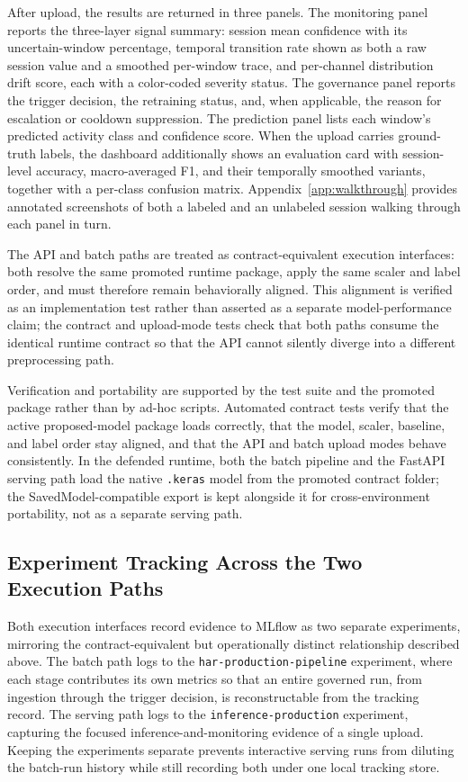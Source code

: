 After upload, the results are returned in three panels. The monitoring panel reports the
three-layer signal summary: session mean confidence with its uncertain-window percentage,
temporal transition rate shown as both a raw session value and a smoothed per-window trace,
and per-channel distribution drift score, each with a color-coded severity status. The
governance panel reports the trigger decision, the retraining status, and, when applicable,
the reason for escalation or cooldown suppression. The prediction panel lists each window's
predicted activity class and confidence score. When the upload carries ground-truth labels,
the dashboard additionally shows an evaluation card with session-level accuracy,
macro-averaged F1, and their temporally smoothed variants, together with a per-class
confusion matrix. Appendix~\ref{app:walkthrough} provides annotated screenshots of both a
labeled and an unlabeled session walking through each panel in turn.

The API and batch paths are treated as contract-equivalent execution interfaces: both resolve the same promoted runtime package, apply the same scaler and label order, and must therefore remain behaviorally aligned. This alignment is verified as an implementation test rather than asserted as a separate model-performance claim; the contract and upload-mode tests check that both paths consume the identical runtime contract so that the API cannot silently diverge into a different preprocessing path.

Verification and portability are supported by the test suite and the promoted package rather than by ad-hoc scripts. Automated contract tests verify that the active proposed-model package loads correctly, that the model, scaler, baseline, and label order stay aligned, and that the API and batch upload modes behave consistently. In the defended runtime, both the batch pipeline and the FastAPI serving path load the native \texttt{.keras} model from the promoted contract folder; the SavedModel-compatible export is kept alongside it for cross-environment portability, not as a separate serving path.

\subsection{Experiment Tracking Across the Two Execution Paths}
\label{sec:experiment_tracking}

Both execution interfaces record evidence to MLflow as two separate experiments, mirroring the contract-equivalent but operationally distinct relationship described above. The batch path logs to the \texttt{har-production-pipeline} experiment, where each stage contributes its own metrics so that an entire governed run, from ingestion through the trigger decision, is reconstructable from the tracking record. The serving path logs to the \texttt{inference-production} experiment, capturing the focused inference-and-monitoring evidence of a single upload. Keeping the experiments separate prevents interactive serving runs from diluting the batch-run history while still recording both under one local tracking store.

